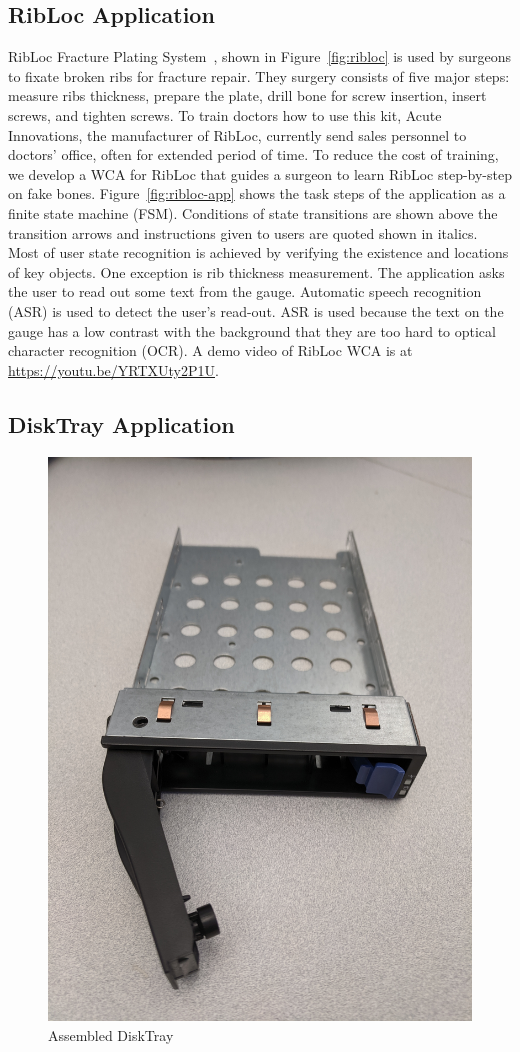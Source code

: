 \subsection{RibLoc Application}

RibLoc Fracture Plating System~\cite{ribloc}, shown in Figure~\ref{fig:ribloc}
is used by surgeons to fixate broken ribs for fracture repair. They surgery
consists of five major steps: measure ribs thickness, prepare the plate, drill
bone for screw insertion, insert screws, and tighten screws. To train doctors
how to use this kit, Acute Innovations, the manufacturer of RibLoc, currently
send sales personnel to doctors' office, often for extended period of time. To
reduce the cost of training, we develop a WCA for RibLoc that guides a surgeon
to learn RibLoc step-by-step on fake bones. Figure~\ref{fig:ribloc-app} shows
the task steps of the application as a finite state machine (FSM). Conditions of
state transitions are shown above the transition arrows and instructions
given to users are quoted shown in italics.
Most of user
state recognition is achieved by verifying the existence and locations of key
objects. One exception is rib thickness measurement. The application asks the
user to read out some text from the gauge. Automatic speech recognition (ASR) is
used to detect the user's read-out. ASR is used because the text on the gauge
has a low contrast with the background that they are too hard to optical
character recognition (OCR). A demo video of RibLoc WCA is at
\url{https://youtu.be/YRTXUty2P1U}.

\subsection{DiskTray Application}

\begin{figure}
\centering
\includegraphics[width=0.3\linewidth]{FIGS/disktray.jpg}
\caption{\small Assembled DiskTray}
\label{fig:disktray}
\end{figure}

